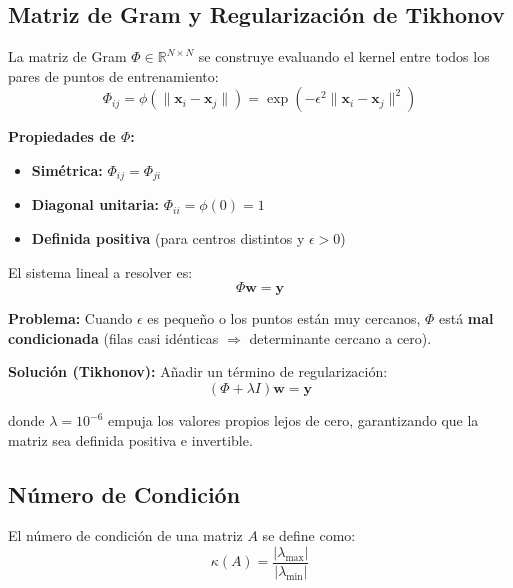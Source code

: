 \documentclass[12pt,a4paper]{article}
\theoremstyle{definition}
\newcommand{\norm}[1]{\|#1\|}
\newcommand{\R}{\mathbb{R}}
\newcommand{\vect}[1]{\mathbf{#1}}
\begin{document}
\subsection{Matriz de Gram y Regularizaci\'{o}n de Tikhonov}

La matriz de Gram $\Phi \in \R^{N \times N}$ se construye evaluando el kernel entre todos los pares de puntos de entrenamiento:
\begin{equation}\label{eq:gram}
\Phi_{ij} = \phi\!\left(\norm{\vect{x}_i - \vect{x}_j}\right) = \exp\!\left(-\epsilon^2 \norm{\vect{x}_i - \vect{x}_j}^2\right)
\end{equation}

\textbf{Propiedades de $\Phi$:}
\begin{itemize}
    \item \textbf{Sim\'{e}trica:} $\Phi_{ij} = \Phi_{ji}$
    \item \textbf{Diagonal unitaria:} $\Phi_{ii} = \phi(0) = 1$
    \item \textbf{Definida positiva} (para centros distintos y $\epsilon > 0$)
\end{itemize}

El sistema lineal a resolver es:
\begin{equation}\label{eq:sistema}
\Phi \vect{w} = \vect{y}
\end{equation}

\textbf{Problema:} Cuando $\epsilon$ es peque\~{n}o o los puntos est\'{a}n muy cercanos, $\Phi$ est\'{a} \textbf{mal condicionada} (filas casi id\'{e}nticas $\Rightarrow$ determinante cercano a cero).

\textbf{Soluci\'{o}n (Tikhonov):} A\~{n}adir un t\'{e}rmino de regularizaci\'{o}n:
\begin{equation}\label{eq:tikhonov}
(\Phi + \lambda I)\vect{w} = \vect{y}
\end{equation}

donde $\lambda = 10^{-6}$ empuja los valores propios lejos de cero, garantizando que la matriz sea definida positiva e invertible.

\subsection{N\'{u}mero de Condici\'{o}n}

El n\'{u}mero de condici\'{o}n de una matriz $A$ se define como:
\begin{equation}\label{eq:condicion}
\kappa(A) = \frac{|\lambda_{\max}|}{|\lambda_{\min}|}
\end{equation}
\end{document}
